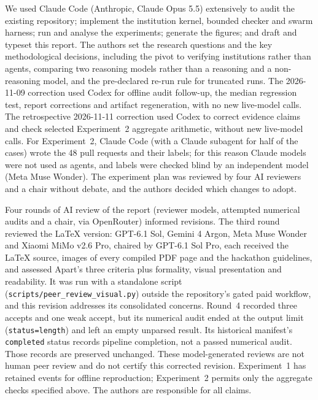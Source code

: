 \documentclass[11pt, letterpaper]{article}
\newcommand{\code}[1]{\texttt{\small #1}}
\begin{document}
We used Claude Code (Anthropic, Claude Opus 5.5) extensively to audit the
existing repository; implement the institution kernel, bounded checker and swarm
harness; run and analyse the experiments; generate the figures; and draft and
typeset this report. The authors set the research questions and the key
methodological decisions, including the pivot to verifying institutions rather
than agents, comparing two reasoning models rather than a reasoning and a
non-reasoning model, and the pre-declared re-run rule for truncated runs. The
2026-11-09 correction used Codex for offline audit follow-up, the median
regression test, report corrections and artifact regeneration, with no new
live-model calls. The retrospective 2026-11-11 correction used Codex to correct
evidence claims and check selected Experiment~2 aggregate arithmetic, without
new live-model calls. For Experiment~2, Claude Code (with a Claude subagent for half
of the cases) wrote the 48 pull requests and their labels; for this reason Claude
models were not used as agents, and labels were checked blind by an independent
model (Meta Muse Wonder). The experiment plan was reviewed by four AI reviewers
and a chair without debate, and the authors decided which changes to adopt.

Four rounds of AI review of the report (reviewer models, attempted numerical
audits and a chair, via OpenRouter) informed revisions. The third round
reviewed the LaTeX version: GPT-6.1 Sol, Gemini 4 Argon, Meta Muse Wonder and
Xiaomi MiMo v2.6 Pro, chaired by GPT-6.1 Sol Pro, each received the LaTeX source,
images of every compiled PDF page and the hackathon guidelines, and assessed
Apart's three criteria plus formality, visual presentation and readability. It
was run with a standalone script (\code{scripts/peer\_review\_visual.py}) outside
the repository's gated paid workflow, and this revision addresses its
consolidated concerns. Round~4 recorded three accepts and one weak accept, but
its numerical audit ended at the output limit (\code{status=length}) and left
an empty unparsed result. Its historical manifest's \code{completed} status
records pipeline completion, not a passed numerical audit. Those records are
preserved unchanged. These model-generated reviews are not human peer review
and do not certify this corrected revision. Experiment~1 has retained events
for offline reproduction; Experiment~2 permits only the aggregate checks
specified above. The authors are responsible for all claims.
\end{document}
